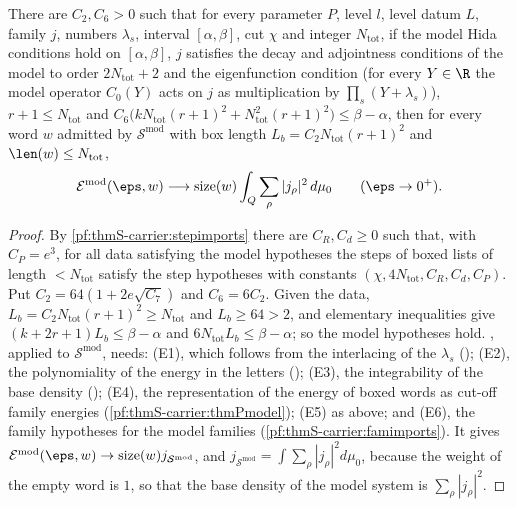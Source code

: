 \begin{theorem}\label{pf:thmS-carrier:lemmamodel}
There are $C_2,C_6>0$ such that for every parameter $P$, level $l$, level datum $L$, family $j$, numbers $\lambda_s$, interval
$[\alpha,\beta]$, cut $\chi$ and integer $N_{\mathrm{tot}}$, if the model Hida conditions hold on $[\alpha,\beta]$, $j$ satisfies
the decay and adjointness conditions of the model to order $2N_{\mathrm{tot}}+2$ and the eigenfunction condition (for every
$Y\in\R$ the model operator $C_0(Y)$ acts on $j$ as multiplication by $\prod_s(Y+\lambda_s)$), $r+1\le N_{\mathrm{tot}}$ and
$C_6\bigl(kN_{\mathrm{tot}}(r+1)^2+N_{\mathrm{tot}}^2(r+1)^2\bigr)\le\beta-\alpha$, then for every word $w$ admitted by
$\mathcal S^{\mathrm{mod}}$ with box length $L_b=C_2N_{\mathrm{tot}}(r+1)^2$ and $\len(w)\le N_{\mathrm{tot}}$,
\[
\thmScarrierEn^{\mathrm{mod}}(\eps,w)\longrightarrow\mathrm{size}(w)\int_Q\sum_\rho|j_\rho|^2\,d\mu_0\qquad(\eps\to0^+).
\]
\end{theorem}

\begin{proof}
By \cref{pf:thmS-carrier:stepimports} there are $C_R,C_d\ge0$ such that, with $C_P=e^3$, for all data satisfying the model
hypotheses the steps of boxed lists of length $<N_{\mathrm{tot}}$ satisfy the step hypotheses with constants
$(\chi,4N_{\mathrm{tot}},C_R,C_d,C_P)$. Put $C_2=64(1+2e\sqrt{C_7})$ and $C_6=6C_2$. Given the data,
$L_b=C_2N_{\mathrm{tot}}(r+1)^2\ge N_{\mathrm{tot}}$ and $L_b\ge64>2$, and elementary inequalities give $(k+2r+1)L_b\le\beta-
\alpha$ and $6N_{\mathrm{tot}}L_b\le\beta-\alpha$; so the model hypotheses hold. , applied to
$\mathcal S^{\mathrm{mod}}$, needs:
(E1), which follows from the interlacing of the $\lambda_s$ (); (E2), the
polynomiality of the energy in the letters (); (E3), the integrability of
the base density (); (E4), the representation of the energy of
boxed words as cut-off family energies (\cref{pf:thmS-carrier:thmPmodel}); (E5) as above; and (E6), the family hypotheses for
the model families (\cref{pf:thmS-carrier:famimports}). It gives
$\thmScarrierEn^{\mathrm{mod}}(\eps,w)\to\mathrm{size}(w)j_{\mathcal S^{\mathrm{mod}}}$, and
$j_{\mathcal S^{\mathrm{mod}}}=\int\sum_\rho|j_\rho|^2d\mu_0$, because the weight of the empty word is $1$, so that the base
density of the model system is $\sum_\rho|j_\rho|^2$.
\end{proof}

